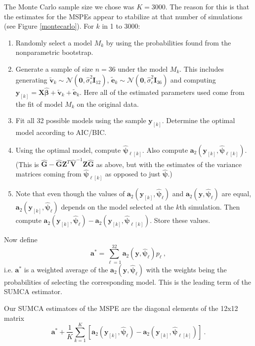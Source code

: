 \documentclass{article}
\begin{document}
The Monte Carlo sample size we chose was $K=3000$. The reason for this is that the estimates for the MSPEs appear to stabilize at that number of simulations (see Figure \ref{montecarlo}). For $k$ in 1 to 3000:
\begin{enumerate}
	\item Randomly select a model $M_k$ by using the probabilities found from the nonparametric bootstrap.
	\item Generate a sample of size $n=36$ under the model $M_k$. This includes generating $\tilde{\mathbf v}_k \sim \mathcal N(\mathbf 0,\hat{\sigma}_v^2 \mathbf I_{12})$, $\tilde{\mathbf e}_k \sim \mathcal N(\mathbf 0, \hat{\sigma}_e^2 \mathbf I_{36})$ and computing $\mathbf y_{[k]}=\mathbf X\hat{\boldsymbol\beta} + \tilde{\mathbf v}_k + \tilde{\mathbf e}_k$. Here all of the estimated parameters used come from the fit of model $M_k$ on the original data.
	\item Fit all 32 possible models using the sample $\mathbf y_{[k]}$. Determine the optimal model according to AIC/BIC.
	\item Using the optimal model, compute $\hat{\boldsymbol\psi}_{\ell[k]}$. Also compute $\mathbf a_2(\mathbf y_{[k]},\hat{\boldsymbol\psi}_{\ell[k]})$. (This is $\hat{\mathbf G}-\hat{\mathbf G}\mathbf Z^T \hat{\mathbf V}^{-1} \mathbf Z \hat{\mathbf G}$ as above, but with the estimates of the variance matrices coming from $\hat{\boldsymbol\psi}_{\ell[k]}$ as opposed to just $\hat{\boldsymbol\psi}$.)
	\item Note that even though the values of $\mathbf a_2(\mathbf y_{[k]},\hat{\boldsymbol\psi}_\ell)$ and $\mathbf a_2(\mathbf y,\hat{\boldsymbol\psi}_\ell)$ are equal, $\mathbf a_2(\mathbf y_{[k]},\hat{\boldsymbol\psi}_\ell)$ depends on the model selected at the $k$th simulation. Then compute $\mathbf a_2(\mathbf y_{[k]},\hat{\boldsymbol\psi}_\ell)-\mathbf a_2(\mathbf y_{[k]},\hat{\boldsymbol\psi}_{\ell[k]})$. Store these values.
\end{enumerate}

Now define 
\[
\mathbf a^* = \sum_{\ell=1}^{32} \mathbf a_2(\mathbf y,\hat{\boldsymbol\psi}_\ell)p_\ell\ ,
\]
i.e. $\mathbf a^*$ is a weighted average of the $\mathbf a_2(\mathbf y,\hat{\boldsymbol\psi}_\ell)$ with the weights being the probabilities of selecting the corresponding model. This is the leading term of the SUMCA estimator.
\medbreak

Our SUMCA estimators of the MSPE are the diagonal elements of the 12x12 matrix
\[
\mathbf a^* + \frac{1}{K}\sum_{k=1}^K [\mathbf a_2(\mathbf y_{[k]},\hat{\boldsymbol\psi}_\ell)-\mathbf a_2(\mathbf y_{[k]},\hat{\boldsymbol\psi}_{\ell[k]})]\ .
\]
\end{document}
